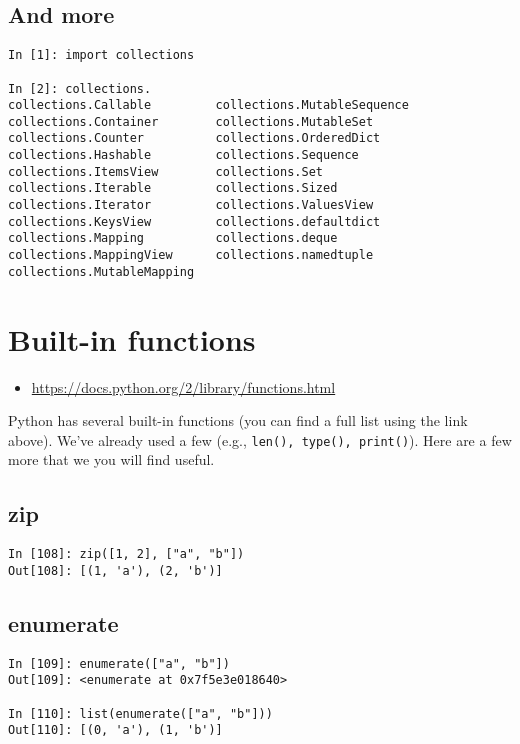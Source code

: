 %
%

\subsection{And more}

\begin{verbatim}
In [1]: import collections

In [2]: collections.
collections.Callable         collections.MutableSequence
collections.Container        collections.MutableSet
collections.Counter          collections.OrderedDict
collections.Hashable         collections.Sequence
collections.ItemsView        collections.Set
collections.Iterable         collections.Sized
collections.Iterator         collections.ValuesView
collections.KeysView         collections.defaultdict
collections.Mapping          collections.deque
collections.MappingView      collections.namedtuple
collections.MutableMapping   
\end{verbatim}

\section{Built-in functions}
\begin{itemize}
\item \url{https://docs.python.org/2/library/functions.html}
\end{itemize}

Python has several built-in functions (you can find a full list using the link
above).  We've already used a few (e.g., \texttt{len(), type(), print()}).
Here are a few more that we you will find useful.

\subsection{zip}
\begin{verbatim}
In [108]: zip([1, 2], ["a", "b"])
Out[108]: [(1, 'a'), (2, 'b')]
\end{verbatim}

\subsection{enumerate}
\begin{verbatim}
In [109]: enumerate(["a", "b"])
Out[109]: <enumerate at 0x7f5e3e018640>

In [110]: list(enumerate(["a", "b"]))
Out[110]: [(0, 'a'), (1, 'b')]
\end{verbatim}

